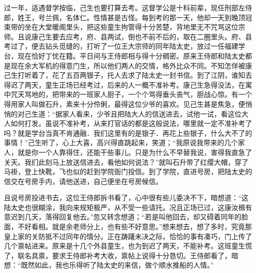 \documentclass[12pt,UTF8]{ctexbook}
\begin{document}
{{{过一年，适遇督学按临，己生也要打算去考。这督学公是十科前辈，现任刑部左侍郎，姓王，号兰佩，名体仁。性情甚是古怪。每到考的那一天，他却一天到晚顶冠束带的坐在大堂暖阁里头，把这些童生拘管得十分苦楚，背地里无不咒骂这位宗师。且说康己生要去应考，府、县两试，倒也不前不后的，取在二圈里头。府、县考过了，便去钻头觅缝的，打听了一位王大宗师的同年陆太史，放过一任福建学台，现在恰好丁忧在籍。平日间与王侍郎相与得十分稠密。原来王侍郎和陆太史都是现在余大军机的得意门生，所以他们两人的交情，格外比众不同。不知怎佯被康己生打听着了，花了五百两银子，托人去求了陆太史一封书信。到了江阴，谁知去得迟了两天，童生正场已经考过，后来的人一概不准补考。康己生急得没法，在寓中咒天骂地的，把带来的一班家人厨子，一个个骂得垂头丧气，胆战心惊。有一个得用家人叫做石升，素来十分伶俐，最得这位少爷的喜欢。见己生甚是焦急，便悄悄的对己生道：“据家人看来，少爷且把陆大人的信送进去，试他一试，看这位大人如何打发。虽说不准补考，从来打官话的都是这般说法，哪里就一定不准补考了吗？就是学台当真不肯通融．我们这里有的是银子．再花上些银子，什么大不了的事情！”己生听了，心上大喜，高兴得直跳起来，笑道；“我原说我带来的几个家人，就是你一个人靠得住，还能干些事儿。只是为什么不早替我说，害得我直急了关天。我们此刻马上放送信进去，看他如何说法？”就叫石升带了红缨大帽，穿了马褂，登上快靴，飞也似的赶到学院衙门投信。到了学院，直进号房，把陆太史的信交在号房手内，请他送进，自己便坐在号房候信。

且说号房投进书去，这位王侍郎拆书看了，心中很有些儿委决不下，暗想道：“这陆太史也很糊涂，我向来规矩极严，从不受一些请托。况且正场已过，这康汝楫有意迟到几天，落得回复他去。”忽又转念想道；“若是叫他回去，却又碍着同年的脸面，不好看相。就是余老师分上，也有些不好意思。”想来想去，想了多时，究竟那皇上家的关防抵不过同年的情分。正在踌躇未决之际，恰恰的事有凑巧，门上传了几个禀帖进来。原来是十几个外县童生，也为到迟了两天，不能补考。这班童生慌了，联名具禀，要求王侍郎补考大收，禀帖上说得十分恳切。王侍郎看了，暗想：“既然如此，我也乐得听了陆太史的来信，做个顺水推船的人情。”

}}}
\end{document}
